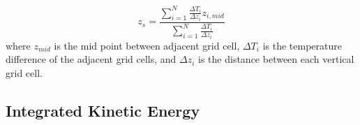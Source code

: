 $$z_s=\frac{\sum_{i=1}^N \frac{\Delta T_i}{\Delta z_i} z_{i,mid}}{\sum_{i=1}^N \frac{\Delta T_i}{\Delta z_i}}$$
where $z_{mid}$ is the mid point between adjacent grid cell, $\Delta T_i$ is the temperature difference of the adjacent grid cells, and $\Delta z_i$ 
is the distance between each vertical grid cell. 
 
\begin{comment}
Near-inertial potential energy is carried in undulations of pycnolines. The largest of these vertical migrations occur
at the thermocline, therefore undulations of the thermocline are commonly used as an estimate of near-inertial potential energy. Two methods
for estimating the thermocline were considered. \citet{austin2011sensitivity} proposed a method of calculating the vertical stratification scale given discrete data : 

$$z_s = \frac{\sum(T_i-T_B)\Delta z_i}{(T_S -T_B)} $$

Where $T_i$ is the temperature at depth level $i$, $T_S$ and $T_B$ are the temperature at the surface and at the bottom respectively and  $\Delta z_i$ is the spacing between observations. 
A common method to estimate the thermocline depth is to calculate
the maximum Brunt-V\"{a}is\"{a}l\"{a} frequency \footnote{Named in honor of Sir David Brunt and Vilho V\"{a}is\"{a}l\"{a}, the Brunt-V\"{a}is\"{a}l\"{a} frequency is also commonly referred to as buoyancy frequency} denoted by $N$ and usually written as $N^2$ : 

$$N^2 = \frac{-g}{\rho_o}\frac{\partial \rho(z)}{\partial z} $$

where $g$ is gravitational acceleration $\rho_o$ is a reference density and $\rho(z)$ is the density at depth $z$.  The depth where $N^2$ is maximum was found
to be a more robust measure the thermocline depth and will therefore be used as an estimate of the thermocline depth. 
\end{comment}

\subsection{Integrated Kinetic Energy}

